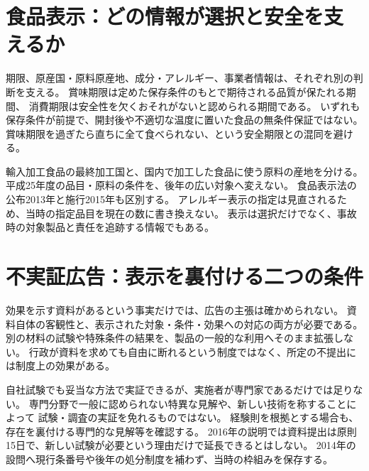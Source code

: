 \section{食品表示：どの情報が選択と安全を支えるか}
\label{theory:compliance:foodlabel}
期限、原産国・原料原産地、成分・アレルギー、事業者情報は、それぞれ別の判断を支える。
賞味期限は定めた保存条件のもとで期待される品質が保たれる期間、
消費期限は安全性を欠くおそれがないと認められる期間である。
いずれも保存条件が前提で、開封後や不適切な温度に置いた食品の無条件保証ではない。
賞味期限を過ぎたら直ちに全て食べられない、という安全期限との混同を避ける。\cite{saf53_food_expiry,saf53_food_loss2013}

輸入加工食品の最終加工国と、国内で加工した食品に使う原料の産地を分ける。
平成25年度の品目・原料の条件を、後年の広い対象へ変えない。
食品表示法の公布2013年と施行2015年も区別する。
アレルギー表示の指定は見直されるため、当時の指定品目を現在の数に書き換えない。\cite{saf53_food_notice}
表示は選択だけでなく、事故時の対象製品と責任を追跡する情報でもある。

\section{不実証広告：表示を裏付ける二つの条件}
\label{theory:compliance:adevidence}
効果を示す資料があるという事実だけでは、広告の主張は確かめられない。
資料自体の客観性と、表示された対象・条件・効果への対応の両方が必要である。
別の材料の試験や特殊条件の結果を、製品の一般的な利用へそのまま拡張しない。
行政が資料を求めても自由に断れるという制度ではなく、所定の不提出には制度上の効果がある。\cite{saf53_ad_overview}

自社試験でも妥当な方法で実証できるが、実施者が専門家であるだけでは足りない。
専門分野で一般に認められない特異な見解や、新しい技術を称することによって
試験・調査の実証を免れるものではない。
経験則を根拠とする場合も、存在を裏付ける専門的な見解等を確認する。\cite{saf53_ad2016}
2016年の説明では資料提出は原則15日で、新しい試験が必要という理由だけで延長できるとはしない。
2014年の設問へ現行条番号や後年の処分制度を補わず、当時の枠組みを保存する。
